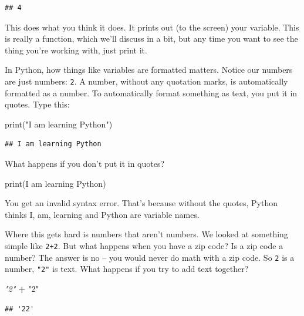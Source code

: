 \documentclass[
]{book}
\newenvironment{Shaded}{\begin{snugshade}}{\end{snugshade}}
\newcommand{\BuiltInTok}[1]{#1}
\newcommand{\CommentTok}[1]{\textcolor[rgb]{0.56,0.35,0.01}{\textit{#1}}}
\newcommand{\NormalTok}[1]{#1}
\newcommand{\OperatorTok}[1]{\textcolor[rgb]{0.81,0.36,0.00}{\textbf{#1}}}
\newcommand{\StringTok}[1]{\textcolor[rgb]{0.31,0.60,0.02}{#1}}
\begin{document}
\begin{verbatim}
## 4
\end{verbatim}

This does what you think it does. It prints out (to the screen) your variable. This is really a function, which we'll discuss in a bit, but any time you want to see the thing you're working with, just print it.

In Python, how things like variables are formatted matters. Notice our numbers are just numbers: \texttt{2}. A number, without any quotation marks, is automatically formatted as a number. To automatically format something as text, you put it in quotes. Type this:

\begin{Shaded}
\begin{Highlighting}[]
\BuiltInTok{print}\NormalTok{(}\StringTok{"I am learning Python"}\NormalTok{)}
\end{Highlighting}
\end{Shaded}

\begin{verbatim}
## I am learning Python
\end{verbatim}

What happens if you don't put it in quotes?

\begin{Shaded}
\begin{Highlighting}[]
\BuiltInTok{print}\NormalTok{(I am learning Python)}
\end{Highlighting}
\end{Shaded}

You get an invalid syntax error. That's because without the quotes, Python thinks I, am, learning and Python are variable names.

Where this gets hard is numbers that aren't numbers. We looked at something simple like \texttt{2+2}. But what happens when you have a zip code? Is a zip code a number? The answer is no -- you would never do math with a zip code. So \texttt{2} is a number, \texttt{"2"} is text. What happens if you try to add text together?

\begin{Shaded}
\begin{Highlighting}[]
\CommentTok{"2"} \OperatorTok{+} \StringTok{"2"} 
\end{Highlighting}
\end{Shaded}

\begin{verbatim}
## '22'
\end{verbatim}
\end{document}
